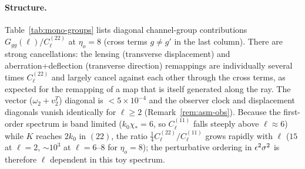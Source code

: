 \paragraph{Structure.}  Table~\ref{tab:mono-groups} lists diagonal channel-group contributions $G_{gg}(\ell)/C^{(22)}_\ell$ at $\eta_o=8$
(cross terms $g\neq g'$ in the last column).  There are strong cancellations: the lensing (transverse displacement) and
aberration+deflection (transverse direction) remappings are individually several times $C^{(22)}_\ell$ and largely cancel against
each other through the cross terms, as expected for the remapping of a map that is itself generated along the ray.  The vector
($\omega_2+v^T_2$) diagonal is $<5\times10^{-4}$ and the observer clock and displacement diagonals vanish identically for $\ell\ge2$
(Remark~\ref{rem:asm-obs}).  Because the first-order spectrum is band limited ($k_0\chi_*=6$, so $C^{(11)}_\ell$ falls steeply above
$\ell\approx6$) while $K$ reaches $2k_0$ in $(22)$, the ratio $\tfrac14C^{(22)}_\ell/C^{(11)}_\ell$ grows rapidly with $\ell$
($15$ at $\ell=2$, $\sim10^3$ at $\ell=6$--$8$ for $\eta_o=8$); the perturbative ordering in $\epsilon^2\sigma^2$ is therefore $\ell$
dependent in this toy spectrum.

